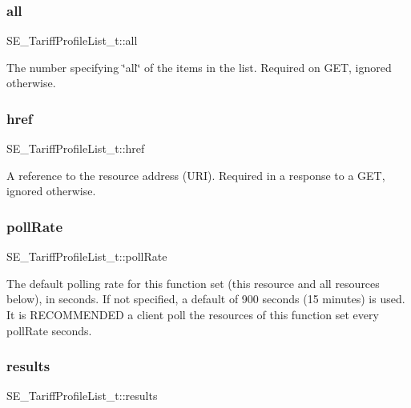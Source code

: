 \subsubsection{\texorpdfstring{all}{all}}
{\footnotesize\ttfamily S\+E\+\_\+\+Tariff\+Profile\+List\+\_\+t\+::all}

The number specifying \char`\"{}all\char`\"{} of the items in the list. Required on G\+ET, ignored otherwise. \mbox{\label{group__TariffProfileList_ga4bb7a09526e0326e0467e6964ffc5836}} 
\subsubsection{\texorpdfstring{href}{href}}
{\footnotesize\ttfamily S\+E\+\_\+\+Tariff\+Profile\+List\+\_\+t\+::href}

A reference to the resource address (U\+RI). Required in a response to a G\+ET, ignored otherwise. \mbox{\label{group__TariffProfileList_gad9e0c75fafd8450f4d505c965c3a889d}} 
\subsubsection{\texorpdfstring{poll\+Rate}{pollRate}}
{\footnotesize\ttfamily S\+E\+\_\+\+Tariff\+Profile\+List\+\_\+t\+::poll\+Rate}

The default polling rate for this function set (this resource and all resources below), in seconds. If not specified, a default of 900 seconds (15 minutes) is used. It is R\+E\+C\+O\+M\+M\+E\+N\+D\+ED a client poll the resources of this function set every poll\+Rate seconds. \mbox{\label{group__TariffProfileList_ga7865e883422f7ffd3ce157762c025a94}} 
\subsubsection{\texorpdfstring{results}{results}}
{\footnotesize\ttfamily S\+E\+\_\+\+Tariff\+Profile\+List\+\_\+t\+::results}

